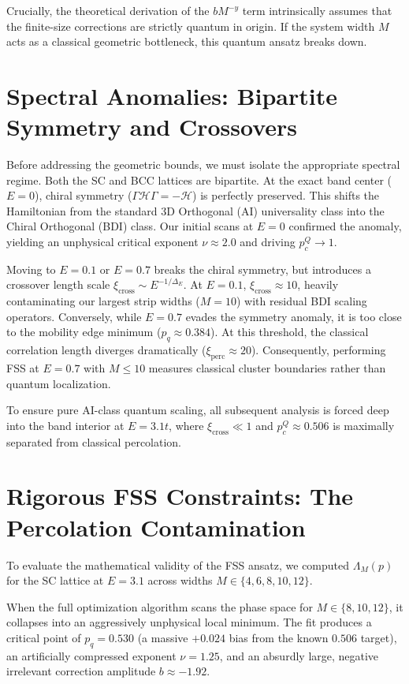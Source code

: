 \documentclass[11pt,a4paper]{article}
\begin{document}
Crucially, the theoretical derivation of the $b M^{-y}$ term intrinsically assumes that the finite-size corrections are strictly quantum in origin. If the system width $M$ acts as a classical geometric bottleneck, this quantum ansatz breaks down.

\section{Spectral Anomalies: Bipartite Symmetry and Crossovers}

Before addressing the geometric bounds, we must isolate the appropriate spectral regime. Both the SC and BCC lattices are bipartite. At the exact band center ($E=0$), chiral symmetry ($\Gamma \mathcal{H} \Gamma = -\mathcal{H}$) is perfectly preserved. This shifts the Hamiltonian from the standard 3D Orthogonal (AI) universality class into the Chiral Orthogonal (BDI) class. Our initial scans at $E=0$ confirmed the anomaly, yielding an unphysical critical exponent $\nu \approx 2.0$ and driving $p_c^Q \to 1$.

Moving to $E=0.1$ or $E=0.7$ breaks the chiral symmetry, but introduces a crossover length scale $\xi_{\text{cross}} \sim E^{-1/\Delta_E}$. At $E=0.1$, $\xi_{\text{cross}} \approx 10$, heavily contaminating our largest strip widths ($M=10$) with residual BDI scaling operators. Conversely, while $E=0.7$ evades the symmetry anomaly, it is too close to the mobility edge minimum ($p_q \approx 0.384$). At this threshold, the classical correlation length diverges dramatically ($\xi_{\text{perc}} \approx 20$). Consequently, performing FSS at $E=0.7$ with $M \le 10$ measures classical cluster boundaries rather than quantum localization.

To ensure pure AI-class quantum scaling, all subsequent analysis is forced deep into the band interior at $E=3.1t$, where $\xi_{\text{cross}} \ll 1$ and $p_c^Q \approx 0.506$ is maximally separated from classical percolation.

\section{Rigorous FSS Constraints: The Percolation Contamination}

To evaluate the mathematical validity of the FSS ansatz, we computed $\Lambda_M(p)$ for the SC lattice at $E=3.1$ across widths $M \in \{4, 6, 8, 10, 12\}$. 

When the full optimization algorithm scans the phase space for $M \in \{8, 10, 12\}$, it collapses into an aggressively unphysical local minimum. The fit produces a critical point of $p_q = 0.530$ (a massive $+0.024$ bias from the known $0.506$ target), an artificially compressed exponent $\nu = 1.25$, and an absurdly large, negative irrelevant correction amplitude $b \approx -1.92$. 
\end{document}
